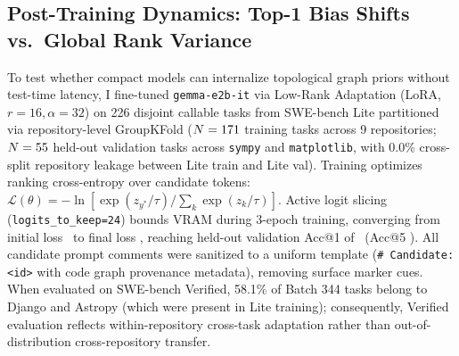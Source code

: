 \documentclass[10pt]{article}
\begin{document}
\subsection{Post-Training Dynamics: Top-1 Bias Shifts vs.\ Global Rank Variance}
\label{sec:lora_transfer}
To test whether compact models can internalize topological graph priors without test-time latency, I fine-tuned \texttt{gemma\allowbreak-e2b\allowbreak-it} via Low-Rank Adaptation (LoRA, $r=16, \alpha=32$) on 226 disjoint callable tasks from SWE-bench Lite partitioned via repository-level GroupKFold ($N=171$ training tasks across 9 repositories; $N=55$ held-out validation tasks across \texttt{sympy} and \texttt{matplotlib}, with 0.0\% cross-split repository leakage between Lite train and Lite val). Training optimizes ranking cross-entropy over candidate tokens: $\mathcal{L}(\theta) = -\ln [\exp(z_{y^*}/\tau) / \sum_k \exp(z_k/\tau)]$. Active logit slicing (\texttt{logits\_to\_keep=24}) bounds VRAM during 3-epoch training, converging from initial loss \LoraGenInitialLoss\ to final loss \LoraGenFinalLoss, reaching held-out validation Acc@1 of \LoraGenValFinalAccOne\ (Acc@5 \LoraGenValFinalAccFive). All candidate prompt comments were sanitized to a uniform template (\texttt{\# Candidate: <id>} with code graph provenance metadata), removing surface marker cues. When evaluated on SWE-bench Verified, 58.1\% of Batch 344 tasks belong to Django and Astropy (which were present in Lite training); consequently, Verified evaluation reflects within-repository cross-task adaptation rather than out-of-distribution cross-repository transfer.
\end{document}
